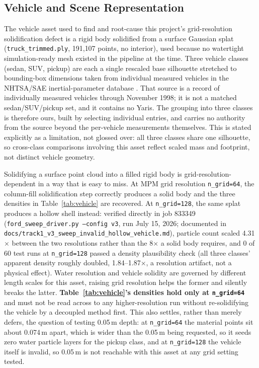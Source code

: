 \documentclass[conference]{IEEEtran}
\begin{document}
\subsection{Vehicle and Scene Representation}
The vehicle asset used to find and root-cause this project's grid-resolution solidification defect is a rigid body solidified from a surface Gaussian splat (\texttt{truck\_trimmed.ply}, 191{,}107 points, no interior), used because no watertight simulation-ready mesh existed in the pipeline at the time. Three vehicle classes (sedan, SUV, pickup) are each a single rescaled base silhouette stretched to bounding-box dimensions taken from individual measured vehicles in the NHTSA/SAE inertial-parameter database \cite{heydinger1999sae}. That source is a record of individually measured vehicles through November 1998; it is not a matched sedan/SUV/pickup set, and it contains no Yaris. The grouping into three classes is therefore ours, built by selecting individual entries, and carries no authority from the source beyond the per-vehicle measurements themselves. This is stated explicitly as a limitation, not glossed over: all three classes share one silhouette, so cross-class comparisons involving this asset reflect scaled mass and footprint, not distinct vehicle geometry.

Solidifying a surface point cloud into a filled rigid body is grid-resolution-dependent in a way that is easy to miss. At MPM grid resolution \texttt{n\_grid=64}, the column-fill solidification step correctly produces a solid body and the three densities in Table~\ref{tab:vehicle} are recovered. At \texttt{n\_grid=128}, the same splat produces a hollow shell instead: verified directly in job 833349 (\texttt{ford\_sweep\_driver.py --config v3}, run July 15, 2026; documented in \texttt{docs/\allowbreak track1\_v3\_\allowbreak sweep\_invalid\_\allowbreak hollow\_vehicle.md}), particle count scaled 4.31$\times$ between the two resolutions rather than the 8$\times$ a solid body requires, and 0 of 60 test runs at \texttt{n\_grid=128} passed a density plausibility check (all three classes' apparent density roughly doubled, 1.84--1.87$\times$, a resolution artifact, not a physical effect). Water resolution and vehicle solidity are governed by different length scales for this asset, raising grid resolution helps the former and silently breaks the latter. \textbf{Table~\ref{tab:vehicle}'s densities hold only at \texttt{n\_grid=64}} and must not be read across to any higher-resolution run without re-solidifying the vehicle by a decoupled method first. This also settles, rather than merely defers, the question of testing 0.05\,m depth: at \texttt{n\_grid=64} the material points sit about 0.074\,m apart, which is wider than the 0.05\,m being requested, so it seeds zero water particle layers for the pickup class, and at \texttt{n\_grid=128} the vehicle itself is invalid, so 0.05\,m is not reachable with this asset at any grid setting tested.
\end{document}
